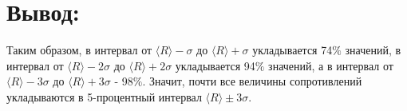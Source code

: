 \documentclass[a4paper, 12pt]{article}
\begin{document}
	\section*{Вывод:}
		Таким образом, в интервал от $\langle R\rangle - \sigma$ до $\langle R\rangle + \sigma$ укладывается 74$\%$ значений, в интервал от $\langle R\rangle - 2\sigma$ до $\langle R\rangle + 2\sigma$ укладывается 94$\%$ значений, а в интервал от $\langle R\rangle - 3\sigma$ до $\langle R\rangle + 3\sigma$ - 98$\%$. Значит, почти все величины сопротивлений укладываются в 5-процентный интервал $\langle R \rangle \pm 3 \sigma$.
\end{document}
